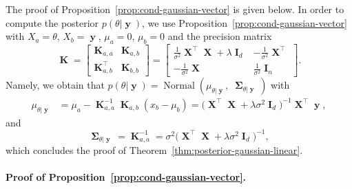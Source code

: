 \documentclass[
	fontsize=11pt, %
	twoside=false, %
	numbers=noenddot, %
]{kaobook}
\DeclareMathOperator{\bI}{{\boldsymbol I}}
\DeclareMathOperator{\bK}{{\boldsymbol K}}
\DeclareMathOperator{\bX}{{\boldsymbol X}}
\DeclareMathOperator{\by}{{\boldsymbol y}}
\DeclareMathOperator{\bSigma}{\boldsymbol \Sigma}
\DeclareMathOperator{\nor}{Normal}
\begin{document}
The proof of Proposition~\ref{prop:cond-gaussian-vector} is given below.
In order to compute the posterior $p(\theta | \by)$, we use Proposition~\ref{prop:cond-gaussian-vector} with $X_a = \theta$, $X_b = \by$, $\mu_a = 0$, $\mu_b = 0$ and the precision matrix
\begin{equation*}
	\bK =
	\begin{bmatrix}
		\bK_{a, a} & \bK_{a, b} \\
		\bK_{a, b}^\top & \bK_{b, b}
	\end{bmatrix}
	=
	\begin{bmatrix}
	\frac{1}{\sigma^2} \bX^\top \bX + \lambda \bI_d & - \frac{1}{\sigma^2} \bX^\top  \\
	- \frac{1}{\sigma^2} \bX & \frac{1}{\sigma^2} \bI_n
	\end{bmatrix}.
\end{equation*}
Namely, we obtain that $p(\theta | \by) = \nor(\mu_{\theta | \by}, \; \bSigma_{\theta | \by})$ with
\begin{align*}
	\mu_{\theta | \by} &= \mu_a - \bK_{a, a}^{-1} \bK_{a, b} (x_b - \mu_b) 
	= \big( \bX^\top \bX + \lambda \sigma^2 \bI_d \big)^{-1} \bX^\top \by,
\end{align*}
and
\begin{equation*}
	\bSigma_{\theta | \by} = \bK_{a, a}^{-1} = \sigma^2 \Big( \bX^\top \bX + \lambda \sigma^2 \bI_d \Big)^{-1},
\end{equation*}
which concludes the proof of Theorem~\ref{thm:posterior-gaussian-linear}.

\paragraph{Proof of Proposition~\ref{prop:cond-gaussian-vector}.} %
\end{document}

